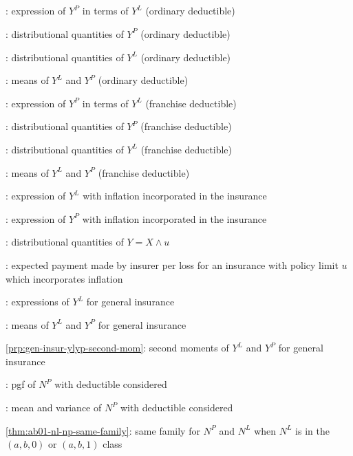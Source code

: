 \subsection*{}
\item {}: expression of \(Y^P\) in terms of \(Y^L\) (ordinary deductible)
\item {}: distributional quantities of \(Y^P\) (ordinary deductible)
\item {}: distributional quantities of \(Y^L\) (ordinary deductible)
\item {}: means of \(Y^L\) and \(Y^P\) (ordinary deductible)
\item {}: expression of \(Y^P\) in terms of \(Y^L\) (franchise deductible)
\item {}: distributional quantities of \(Y^P\) (franchise deductible)
\item {}: distributional quantities of \(Y^L\) (franchise deductible)
\item {}: means of \(Y^L\) and \(Y^P\) (franchise deductible)
\item {}: expression of \(Y^L\) with inflation incorporated in the insurance
\item {}: expression of \(Y^P\) with inflation incorporated in the insurance
\item {}: distributional quantities of \(Y=X\wedge u\)
\item {}: expected payment made by insurer per
loss for an insurance with policy limit \(u\) which incorporates inflation
\item {}: expressions of \(Y^L\) for general insurance
\item {}: means of \(Y^L\) and \(Y^P\) for general insurance
\item \cref{prp:gen-insur-ylyp-second-mom}: second moments of \(Y^L\) and \(Y^P\) for general insurance
\item {}: pgf of \(N^P\) with deductible considered
\item {}: mean and variance of \(N^P\) with deductible considered
\item \cref{thm:ab01-nl-np-same-family}: same family for \(N^P\) and \(N^L\) when \(N^L\) is in the \((a,b,0)\) or \((a,b,1)\) class
